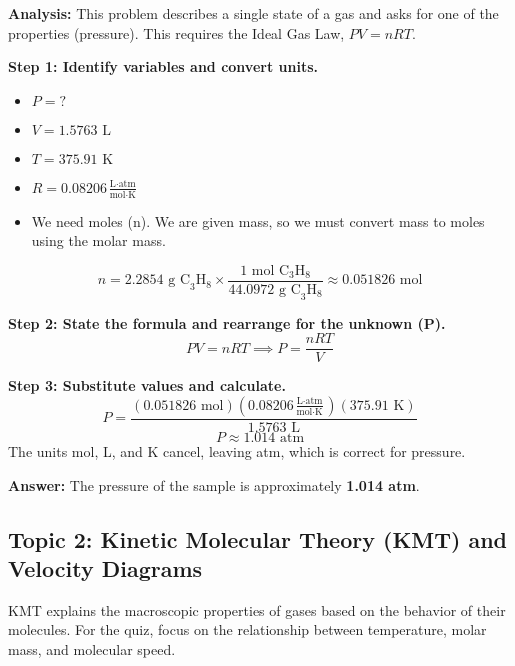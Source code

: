 \documentclass{article}
\begin{document}
\textbf{Analysis:} This problem describes a single state of a gas and asks for one of the properties (pressure). This requires the Ideal Gas Law, $PV=nRT$.

\textbf{Step 1: Identify variables and convert units.}
\begin{itemize}
    \item $P = ?$
    \item $V = 1.5763 \text{ L}$
    \item $T = 375.91 \text{ K}$
    \item $R = 0.08206 \frac{\text{L} \cdot \text{atm}}{\text{mol} \cdot \text{K}}$
    \item We need moles (n). We are given mass, so we must convert mass to moles using the molar mass.
\end{itemize}
\[ n = 2.2854 \text{ g C}_3\text{H}_8 \times \frac{1 \text{ mol C}_3\text{H}_8}{44.0972 \text{ g C}_3\text{H}_8} \approx 0.051826 \text{ mol} \]

\textbf{Step 2: State the formula and rearrange for the unknown (P).}
\[ PV = nRT \implies P = \frac{nRT}{V} \]

\textbf{Step 3: Substitute values and calculate.}
\[ P = \frac{(0.051826 \text{ mol})(0.08206 \frac{\text{L} \cdot \text{atm}}{\text{mol} \cdot \text{K}})(375.91 \text{ K})}{1.5763 \text{ L}} \]
\[ P \approx 1.014 \text{ atm} \]
The units mol, L, and K cancel, leaving atm, which is correct for pressure.

\textbf{Answer:} The pressure of the sample is approximately \textbf{1.014 atm}.

\subsection{Topic 2: Kinetic Molecular Theory (KMT) and Velocity Diagrams}
KMT explains the macroscopic properties of gases based on the behavior of their molecules. For the quiz, focus on the relationship between temperature, molar mass, and molecular speed.
\end{document}
